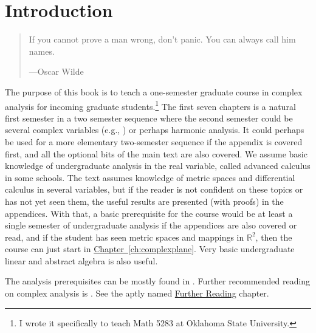 \documentclass[12pt,openany]{book}
\newcommand{\R}{{\mathbb{R}}}
\theoremstyle{plain}
\theoremstyle{remark}
\theoremstyle{definition}
\newenvironment{myepigraph}{%
    \begin{quote}%
    \begingroup\itshape
}{%
    \endgroup%
    \end{quote}
}
\theoremstyle{exercise}
\theoremstyle{example}
\newcommand{\Chapterref}[1]{\hyperref[#1]{Chapter~\ref*{#1}}}
\begin{document}


\chapter*{Introduction} \label{ch:intro}

\begin{myepigraph}
If you cannot prove a man wrong, don't panic. You can always call him names.

---Oscar Wilde 
\end{myepigraph}

The purpose of this book is to teach a one-semester graduate course in
complex analysis for incoming graduate students.\footnote{I wrote it
specifically to teach Math 5283 at Oklahoma State University.}
The first seven chapters is a natural first semester in a two semester sequence where the second
semester could be several complex variables (e.g., \cite{scv:book})
or perhaps harmonic analysis.
It could perhaps be used for a more elementary two-semester sequence if the
appendix is covered first, and all the optional bits of the main text are
also covered.
We assume basic knowledge of undergraduate
analysis in the real variable, called advanced calculus in some schools.
The text assumes knowledge of metric spaces
and differential calculus in several variables, but if the reader is not
confident on these topics or has not yet seen them, the useful results
are presented (with proofs) in the appendices.
With that, a basic prerequisite for the
course would be at least a single semester of undergraduate analysis if the
appendices are also covered or read, and if the student has
seen metric spaces and mappings in $\R^2$, then the course
can just start in \Chapterref{ch:complexplane}.  Very basic undergraduate
linear and abstract algebra is also useful.

The analysis prerequisites can be mostly found in
\cites{ra:book,ra:book2,Rudin:principles}.  Further recommended
reading on complex analysis is \cites{Boas,Conway1,Conway2,Rudin,Ullrich}.
See the aptly named
\hyperref[ch:furtherreading]{Further Reading} chapter.
\end{document}
